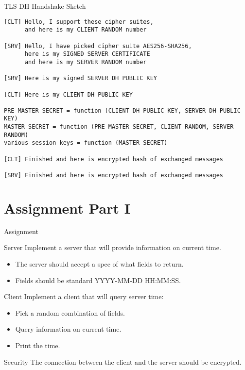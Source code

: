 \begin{frame}[fragile]{TLS DH Handshake Sketch}
\begin{lstlisting}[style=mini]
[CLT] Hello, I support these cipher suites,
      and here is my CLIENT RANDOM number

[SRV] Hello, I have picked cipher suite AES256-SHA256,
      here is my SIGNED SERVER CERTIFICATE
      and here is my SERVER RANDOM number

[SRV] Here is my signed SERVER DH PUBLIC KEY

[CLT] Here is my CLIENT DH PUBLIC KEY

PRE MASTER SECRET = function (CLIENT DH PUBLIC KEY, SERVER DH PUBLIC KEY)
MASTER SECRET = function (PRE MASTER SECRET, CLIENT RANDOM, SERVER RANDOM)
various session keys = function (MASTER SECRET)

[CLT] Finished and here is encrypted hash of exchanged messages

[SRV] Finished and here is encrypted hash of exchanged messages
\end{lstlisting}
\end{frame}


\section{Assignment Part I}


\begin{frame}{Assignment}
    \begin{block}{Server}
        Implement a server that will provide information on current time.
        \begin{itemize}
            \item The server should accept a spec of what fields to return.
            \item Fields should be standard YYYY-MM-DD HH:MM:SS.
        \end{itemize}
    \end{block}

    \begin{block}{Client}
        Implement a client that will query server time:
        \begin{itemize}
            \item Pick a random combination of fields.
            \item Query information on current time.
            \item Print the time.
        \end{itemize}
    \end{block}

    \begin{block}{Security}
        The connection between the client and the server should be encrypted.
    \end{block}
\end{frame}


